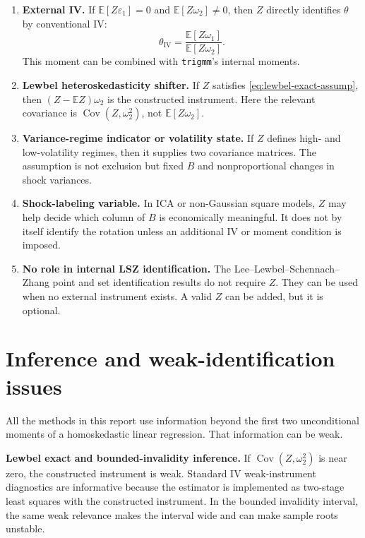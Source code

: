 \documentclass[11pt]{article}
\newcommand{\E}{\mathbb{E}}
\newcommand{\Cov}{\operatorname{Cov}}
\theoremstyle{plain}
\theoremstyle{definition}
\theoremstyle{remark}
\newcommand{\heading}[1]{\vspace{0.5em}\noindent\textbf{#1}}
\begin{document}
\begin{enumerate}[label=\textbf{Role \arabic*.}]
\item \textbf{External IV.} If $\E[Z\varepsilon_1]=0$ and $\E[Z\omega_2]\ne0$, then
$Z$ directly identifies $\theta$ by conventional IV:
\begin{equation}
\theta_{\text{IV}}=\frac{\E[Z\omega_1]}{\E[Z\omega_2]}.
\label{eq:directiv}
\end{equation}
This moment can be combined with \texttt{trigmm}'s internal moments.

\item \textbf{Lewbel heteroskedasticity shifter.} If $Z$ satisfies
\eqref{eq:lewbel-exact-assump}, then $(Z-\E Z)\omega_2$ is the constructed
instrument. Here the relevant covariance is $\Cov(Z,\omega_2^2)$, not $\E[Z\omega_2]$.

\item \textbf{Variance-regime indicator or volatility state.} If $Z$ defines
high- and low-volatility regimes, then it supplies two covariance matrices. The
assumption is not exclusion but fixed $B$ and nonproportional changes in shock
variances.

\item \textbf{Shock-labeling variable.} In ICA or non-Gaussian square models, $Z$
may help decide which column of $B$ is economically meaningful. It does not by
itself identify the rotation unless an additional IV or moment condition is
imposed.

\item \textbf{No role in internal LSZ identification.} The Lee--Lewbel--Schennach--Zhang
point and set identification results do not require $Z$. They can be used when no
external instrument exists. A valid $Z$ can be added, but it is optional.
\end{enumerate}

\section{Inference and weak-identification issues}
\label{sec:inference}

All the methods in this report use information beyond the first two unconditional
moments of a homoskedastic linear regression. That information can be weak.

\heading{Lewbel exact and bounded-invalidity inference.}
If $\Cov(Z,\omega_2^2)$ is near zero, the constructed instrument is weak. Standard IV
weak-instrument diagnostics are informative because the estimator is implemented
as two-stage least squares with the constructed instrument. In the bounded
invalidity interval, the same weak relevance makes the interval wide and can make
sample roots unstable.
\end{document}
